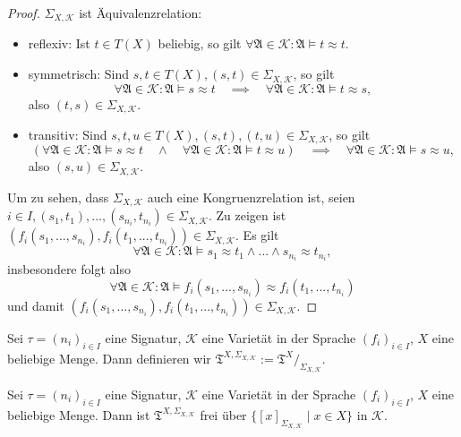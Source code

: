 \begin{proof}
    $\Sigma_{X,\mathcal{K}}$ ist Äquivalenzrelation:
    \begin{itemize}
        \item reflexiv: Ist $t \in T(X)$ beliebig, so gilt $\forall \mathfrak{A} \in \mathcal{K}: \mathfrak{A} \models t \approx t$.
        \item symmetrisch: Sind $s, t \in T(X), (s,t) \in \Sigma_{X,\mathcal{K}}$, so gilt
        $$ \forall \mathfrak{A} \in \mathcal{K}: \mathfrak{A} \models s \approx t \quad \implies \quad \forall \mathfrak{A} \in \mathcal{K}: \mathfrak{A} \models t \approx s, $$
        also $(t,s) \in \Sigma_{X,\mathcal{K}}$.
        \item transitiv: Sind $s,t,u \in T(X), (s,t), (t,u) \in \Sigma_{X,\mathcal{K}}$, so gilt
        $$ (\forall \mathfrak{A} \in \mathcal{K}: \mathfrak{A} \models s \approx t \quad \land \quad \forall \mathfrak{A} \in \mathcal{K}: \mathfrak{A} \models t \approx u) \quad \implies \quad \forall \mathfrak{A} \in \mathcal{K}: \mathfrak{A} \models s \approx u, $$
        also $(s,u) \in \Sigma_{X,\mathcal{K}}$.
    \end{itemize}
    Um zu sehen, dass $\Sigma_{X,\mathcal{K}}$ auch eine Kongruenzrelation ist, seien $i \in I, (s_1, t_1), ..., (s_{n_i}, t_{n_i}) \in \Sigma_{X,\mathcal{K}}$. Zu zeigen ist $(f_i(s_1, ..., s_{n_i}), f_i(t_1, ..., t_{n_i})) \in \Sigma_{X,\mathcal{K}}$. Es gilt
    $$ \forall \mathfrak{A} \in \mathcal{K}: \mathfrak{A} \models s_1 \approx t_1 \land ... \land s_{n_i} \approx t_{n_i}, $$
    insbesondere folgt also
    $$ \forall \mathfrak{A} \in \mathcal{K}: \mathfrak{A} \models f_i(s_1, ..., s_{n_i}) \approx f_i(t_1, ..., t_{n_i}) $$
    und damit $(f_i(s_1, ..., s_{n_i}), f_i(t_1, ..., t_{n_i})) \in \Sigma_{X,\mathcal{K}}$.
\end{proof}

\begin{definition}
    Sei $\tau=(n_i)_{i\in I}$ eine Signatur, $\mathcal{K}$ eine Varietät in der Sprache $(f_i)_{i\in I}$, $X$ eine beliebige Menge. Dann definieren wir $\mathfrak{T}^{X, \Sigma_{X,\mathcal{K}}} := \mathfrak{T}^X /_{\Sigma_{X,\mathcal{K}}}$.
\end{definition}

\begin{theorem}\label{theorem:freie_faktoralgebra}
    Sei $\tau=(n_i)_{i\in I}$ eine Signatur, $\mathcal{K}$ eine Varietät in der Sprache $(f_i)_{i\in I}$, $X$ eine beliebige Menge. Dann ist $\mathfrak{T}^{X, \Sigma_{X,\mathcal{K}}}$ frei über $\{[x]_{\Sigma_{X,\mathcal{K}}}\mid x\in X\}$ in $\mathcal{K}$.
\end{theorem}

